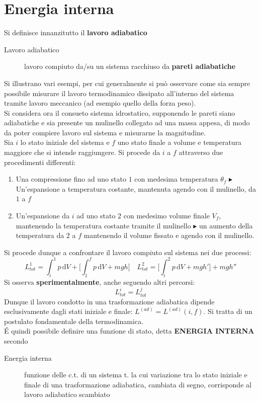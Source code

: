 \documentclass[10pt, oneside]{book}
\newcommand{\ds}{\displaystyle}
\newcommand{\integral}[4]{\int_{#1}^{#2} #3 \, \mathrm{d}#4}
\begin{document}
\section{Energia interna}
Si definisce innanzitutto il \textbf{lavoro adiabatico}
\begin{description}
\item[Lavoro adiabatico] lavoro compiuto da/su un sistema racchiuso da \textbf{pareti adiabatiche}
\end{description}
Si illustrano vari esempi, per cui generalmente si può osservare come sia sempre possibile misurare il lavoro termodinamico dissipato all'interno del sistema tramite lavoro meccanico (ad esempio quello della forza peso).\\Si considera ora il consueto sistema idrostatico, supponendo le pareti siano adiabatiche e sia presente un mulinello collegato ad una massa appesa, di modo da poter compiere lavoro sul sistema e misurarne la magnitudine.\\
Sia $i$ lo stato iniziale del sistema e $f$ uno stato finale a volume e temperatura maggiore che si intende raggiungere. Si procede da $i$ a $f$ attraverso due procedimenti differenti:
\begin{enumerate}
\item Una compressione fino ad uno stato $1$ con medesima temperatura $\theta_f$ $\blacktriangleright$ Un'espansione a temperatura costante, mantenuta agendo con il mulinello, da $1$ a $f$
\item Un'espansione da $i$ ad uno stato $2$ con medesimo volume finale $V_f$, mantenendo la temperatura costante tramite il mulinello $\blacktriangleright$ un aumento della temperatura da $2$ a $f$ mantenendo il volume fissato e agendo con il mulinello.
\end{enumerate}
Si procede dunque a confrontare il lavoro compiuto sul sistema nei due processi:
\[L_{tot}^1 = \integral{i}{1}{p}{V} + \bigg[\integral{1}{f}{p}{V} + mgh\bigg] \quad L_{tot}^2 = \bigg[\integral{i}{2}{p}{V} + mgh'\bigg] + mgh''\]
Si osserva \textbf{sperimentalmente}, anche seguendo altri percorsi:
\[L_{tot}^i = L_{tot}^j\]
Dunque il lavoro condotto in una trasformazione adiabatica dipende esclusivamente dagli stati iniziale e finale: $\ds L^{(ad)} = L^{(ad)}(i,f)$. Si tratta di un postulato fondamentale della termodinamica.\\
\'E quindi possibile definire una funzione di stato, detta \textbf{ENERGIA INTERNA} secondo
\begin{description}
\item[Energia interna] funzione delle c.t. di un sistema t. la cui variazione tra lo stato iniziale e finale di una trasformazione adiabatica, cambiata di segno, corrisponde al lavoro adiabatico scambiato
\end{description}
\end{document}
